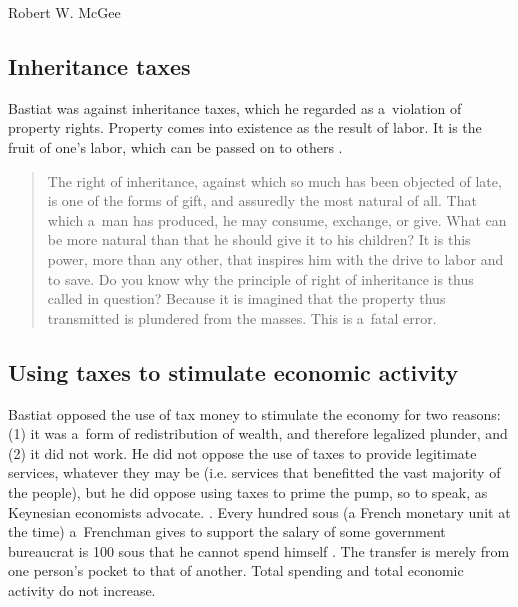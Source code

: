 \begin{artengenv}{Robert W. McGee}
\subsection{Inheritance taxes}



Bastiat was against inheritance taxes, which he regarded as a~violation of property rights. Property comes into existence as the result of labor. It is the fruit of one's labor, which can be passed on to others 
\parencite[][pp.188–193]{bastiat_selected_1964}.%




\begin{quote}
The right of inheritance, against which so much has been objected of late, is one of the forms of gift, and assuredly the most natural of all. That which a~man has produced, he may consume, exchange, or give. What can be more natural than that he should give it to his children? It is this power, more than any other, that inspires him with the drive to labor and to save. Do you know why the principle of right of inheritance is thus called in question? Because it is imagined that the property thus transmitted is plundered from the masses. This is a~fatal error. 
\parencite[][p.142]{bastiat_bastiat_2007}%
\end{quote}




\subsection{Using taxes to stimulate economic activity}



Bastiat opposed the use of tax money to stimulate the economy for two reasons: (1) it was a~form of redistribution of wealth, and therefore legalized plunder, and (2) it did not work. He did not oppose the use of taxes to provide legitimate services, whatever they may be (i.e. services that benefitted the vast majority of the people), but he did oppose using taxes to prime the pump, so to speak, as Keynesian economists advocate. 
\parencite[][pp.8–9, 16]{bastiat_selected_1964}. %
 Every hundred sous (a French monetary unit at the time) a~Frenchman gives to support the salary of some government bureaucrat is 100 sous that he cannot spend himself 
\parencite[][p.8]{bastiat_selected_1964}. %
 The transfer is merely from one person's pocket to that of another. Total spending and total economic activity do not increase.




\end{artengenv}
